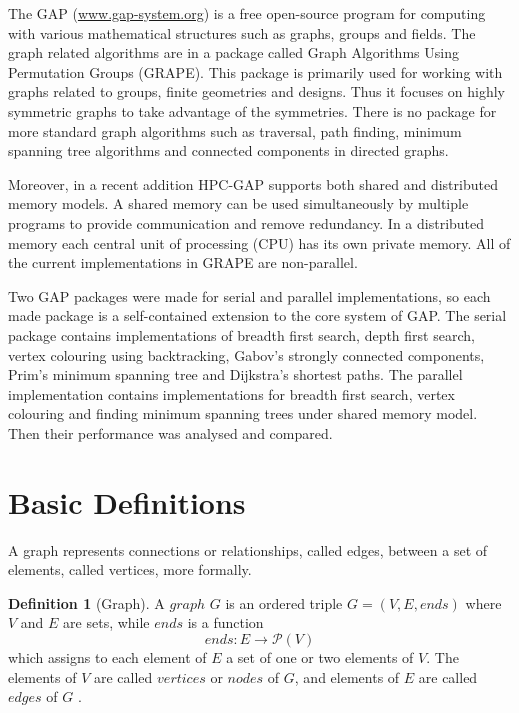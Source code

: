 \documentclass{report}
\theoremstyle{plain}
\theoremstyle{definition}
\newtheorem{definition}{Definition}
\theoremstyle{remark}
\numberwithin{definition}{chapter}
\numberwithin{example}{chapter}
\numberwithin{figure}{chapter}
\begin{document}
The GAP (\url{www.gap-system.org}) is a free open-source program for computing with various mathematical structures such as graphs, groups and fields. The graph related algorithms are in a package called Graph Algorithms Using Permutation Groups (GRAPE). This package is primarily used for working with graphs related to groups, finite geometries and designs. Thus it focuses on highly symmetric graphs to take advantage of the symmetries. There is no package for more standard graph algorithms such as traversal, path finding, minimum spanning tree algorithms and connected components in directed graphs.

Moreover, in a recent addition HPC-GAP supports both shared and distributed memory models. A shared memory can be used simultaneously by multiple programs to provide communication and remove redundancy. In a distributed memory each central unit of processing (CPU) has its own private memory. All of the current implementations in GRAPE are non-parallel.

Two GAP packages were made for serial and parallel implementations, so each made package is a self-contained extension to the core system of GAP. The serial package contains implementations of breadth first search, depth first search, vertex colouring using backtracking, Gabov's strongly connected components, Prim's minimum spanning tree and Dijkstra's shortest paths. The parallel implementation contains implementations for breadth first search, vertex colouring and finding minimum spanning trees under shared memory model. Then their performance was analysed and compared.

\section{Basic Definitions}

A graph represents connections or relationships, called edges, between a set of elements, called vertices, more formally.

\begin{definition}[Graph]
A $graph$  $G$ is an ordered triple $G = (V, E, ends)$ where $V$ and $E$ are sets, while $ends$ is a function 
  \begin{equation}
  ends:E\to \mathcal P \left({V}\right)
  \end{equation}
which assigns to each element of $E$ a set of one or two elements of $V$. The elements of $V$ are called $vertices$ or $nodes$ of $G$, and elements of $E$ are called $edges$ of $G$ \cite{bondy2008graph}.
\end{definition}
\end{document}
